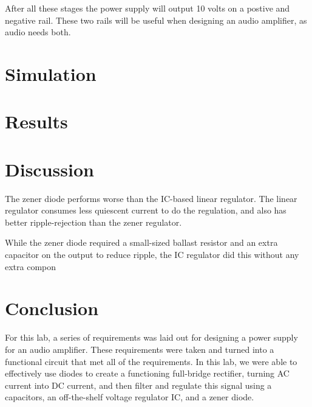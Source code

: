 \documentclass[12pt]{article}
\begin{document}
After all these stages the power supply will output 10 volts on a postive and negative rail. These two rails will be useful when designing an audio amplifier, as audio needs both.

\section{Simulation}

\section{Results}


\section{Discussion}


The zener diode performs worse than the IC-based linear regulator. The linear regulator consumes less quiescent current to do the regulation,
and also has better ripple-rejection than the zener regulator.

While the zener diode required a small-sized ballast resistor and an extra capacitor on the output to reduce ripple,
the IC regulator did this without any extra compon

\section{Conclusion}

For this lab, a series of requirements was laid out for designing a power supply for an audio
amplifier. These requirements were taken and turned into a functional circuit that met
all of the requirements. In this lab, we were able to effectively use diodes to create
a functioning full-bridge rectifier, turning AC current into DC current, and then filter
and regulate this signal using a capacitors, an off-the-shelf voltage regulator IC, and
a zener diode.

\newpage
\end{document}
